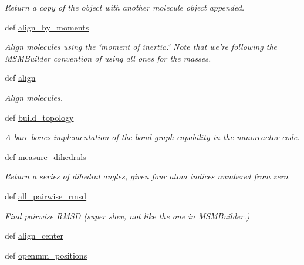 \begin{DoxyCompactItemize}
\begin{DoxyCompactList}\small\item\em \-Return a copy of the object with another molecule object appended. \end{DoxyCompactList}\item 
def \hyperlink{classforcebalance_1_1molecule_1_1Molecule_a685c8092020a46cd7cf5b52ab45ca6e4}{align\-\_\-by\-\_\-moments}
\begin{DoxyCompactList}\small\item\em \-Align molecules using the \char`\"{}moment of inertia.\char`\"{} \-Note that we're following the \-M\-S\-M\-Builder convention of using all ones for the masses. \end{DoxyCompactList}\item 
def \hyperlink{classforcebalance_1_1molecule_1_1Molecule_a87e66db685214a9cdd4feff49d4ea5dc}{align}
\begin{DoxyCompactList}\small\item\em \-Align molecules. \end{DoxyCompactList}\item 
def \hyperlink{classforcebalance_1_1molecule_1_1Molecule_a071f18dacd881f761462f772bb0cf632}{build\-\_\-topology}
\begin{DoxyCompactList}\small\item\em \-A bare-\/bones implementation of the bond graph capability in the nanoreactor code. \end{DoxyCompactList}\item 
def \hyperlink{classforcebalance_1_1molecule_1_1Molecule_aa6b0a08a6579f697667c83e04927298c}{measure\-\_\-dihedrals}
\begin{DoxyCompactList}\small\item\em \-Return a series of dihedral angles, given four atom indices numbered from zero. \end{DoxyCompactList}\item 
def \hyperlink{classforcebalance_1_1molecule_1_1Molecule_af412b655371674434ec63b4bfea6d8c0}{all\-\_\-pairwise\-\_\-rmsd}
\begin{DoxyCompactList}\small\item\em \-Find pairwise \-R\-M\-S\-D (super slow, not like the one in \-M\-S\-M\-Builder.) \end{DoxyCompactList}\item 
def \hyperlink{classforcebalance_1_1molecule_1_1Molecule_aff7a0e2413297088a5bc3e91e5951f3f}{align\-\_\-center}
\item 
def \hyperlink{classforcebalance_1_1molecule_1_1Molecule_a57edc8d72f7e4c1a1452de7b438f3c55}{openmm\-\_\-positions}

\end{DoxyCompactItemize}
